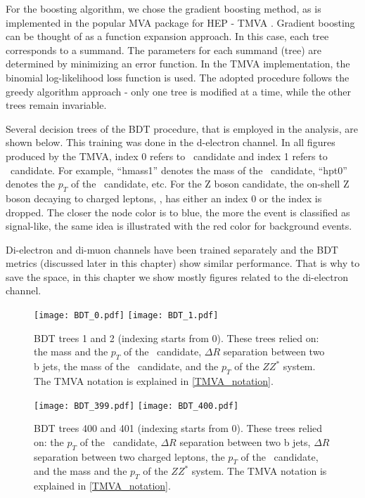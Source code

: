 \begin{small}
For the boosting algorithm, we chose the gradient boosting method, as is implemented in the popular MVA package for HEP - TMVA \cite{Hocker:2007ht}.  Gradient boosting can be thought of as a function expansion approach. In this case, each tree corresponds to a summand. The parameters for each summand (tree) are determined by minimizing an error function. In the TMVA implementation, the binomial log-likelihood loss function is used. The adopted procedure follows the greedy algorithm approach - only one tree is modified at a time, while the other trees remain invariable.

 Several decision trees of the BDT procedure, that is employed in the analysis, are shown below. This training was done in the d-electron channel. In all figures produced by the TMVA, index 0 refers to \HZZ~candidate and index 1 refers to \HBB~candidate. For example, ``hmass1'' denotes the mass of the \HZZ~candidate, ``hpt0'' denotes the $p_T$ of the \HBB~candidate, etc. For the Z boson candidate, the on-shell Z boson decaying to charged leptons, \Zll, has either an index 0 or the index is dropped. The closer the node color is to blue, the more the event is classified as signal-like, the same idea is illustrated with the red color for background events. \label{TMVA_notation}

Di-electron and di-muon channels have been trained separately and the BDT metrics (discussed later in this chapter) show similar performance. That is why to save the space, in this chapter we show mostly figures related to the di-electron channel.
           
 \begin{figure}[H]
  \begin{center}
    \texttt{[image: BDT\_0.pdf]}
    \texttt{[image: BDT\_1.pdf]}\\
     \caption[BDT trees 1 and 2.]{BDT trees 1 and 2 (indexing starts from 0). These trees relied on: the mass and the $p_T$ of the \Zll~candidate, $\Delta R$ separation between two b jets,  the mass of the \HBB~candidate, and the $p_T$ of the $ZZ^*$ system. The TMVA notation is explained in \ref{TMVA_notation}.}
    \label{fig:bdt_trees}
  \end{center}
\end{figure}

\begin{figure}[H]
  \begin{center}
    \texttt{[image: BDT\_399.pdf]}
    \texttt{[image: BDT\_400.pdf]}\\
     \caption[BDT trees 400 and 401.]{BDT trees 400 and 401 (indexing starts from 0). These trees relied on: the $p_T$ of the \Zll~candidate, 
     $\Delta R$ separation between two b jets,
     $\Delta R$ separation between two charged leptons, 
      the $p_T$ of the \HBB~candidate, and the mass and the $p_T$ of the $ZZ^*$ system. The TMVA notation is explained in \ref{TMVA_notation}.}    
      \label{fig:bdt_trees_2}
  \end{center}
\end{figure}


\end{small}
